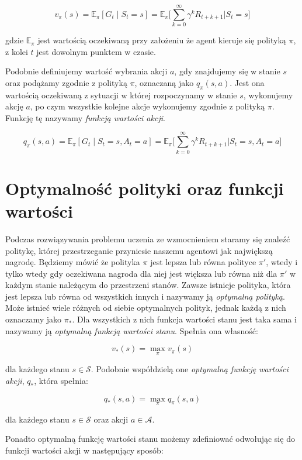 \documentclass[licencjacka]{pracamgr}
\begin{document}
$$ v_{\pi}(s) = \mathbb{E}_{\pi}[G_t \mid S_t = s] = \mathbb{E}_{\pi} \Bigg[ \sum_{k=0}^{\infty} \gamma^k R_{t+k+1} \bigg| S_t = s \Bigg] $$

gdzie $ \mathbb{E}_{\pi} $ jest wartością oczekiwaną przy założeniu że agent kieruje się polityką $\pi$, z kolei $t$ jest dowolnym punktem w czasie. 

Podobnie definiujemy wartość wybrania akcji $a$, gdy znajdujemy się w stanie $s$ oraz podążamy zgodnie z polityką $\pi$, oznaczaną jako $q_{\pi}(s, a)$. Jest ona wartością oczekiwaną z sytuacji w której rozpoczynamy w stanie $s$, wykonujemy akcję $a$, po czym wszystkie kolejne akcje wykonujemy zgodnie z polityką $\pi$. Funkcję tę nazywamy \emph{funkcją wartości akcji}.

$$ q_{\pi}(s, a) = \mathbb{E}_{\pi}[G_t \mid S_t = s, A_t = a] = \mathbb{E}_{\pi} \Bigg[ \sum_{k=0}^{\infty} \gamma^k R_{t+k+1} \bigg| S_t = s, A_t = a \Bigg] $$

\section{Optymalność polityki oraz funkcji wartości}

Podczas rozwiązywania problemu uczenia ze wzmocnieniem staramy się znaleźć politykę, której przestrzeganie przyniesie naszemu agentowi jak największą nagrodę. Będziemy mówić że polityka $\pi$ jest lepsza lub równa polityce $\pi'$, wtedy i tylko wtedy gdy oczekiwana nagroda dla niej jest większa lub równa niż dla $\pi'$ w każdym stanie należącym do przestrzeni stanów. Zawsze istnieje polityka, która jest lepsza lub równa od wszystkich innych i nazywamy ją \emph{optymalną polityką}. Może istnieć wiele różnych od siebie optymalnych polityk, jednak każdą z nich oznaczamy jako $\pi_{\ast}$. Dla wszystkich z nich funkcja wartości stanu jest taka sama i nazywamy ją \emph{optymalną funkcją wartości stanu}. Spełnia ona własność:

$$ v_{\ast}(s) = \max_{\pi} v_{\pi}(s) $$

dla każdego stanu $s \in \mathcal{S}$. Podobnie współdzielą one \emph{optymalną funkcję wartości akcji}, $q_{\ast}$, która spełnia:

$$ q_{\ast}(s, a) = \max_{\pi} q_{\pi}(s, a) $$

dla każdego stanu $s \in \mathcal{S}$ oraz akcji $a \in \mathcal{A}$.

Ponadto optymalną funkcję wartości stanu możemy zdefiniować odwołując się do funkcji wartości akcji w następujący sposób:
\end{document}
